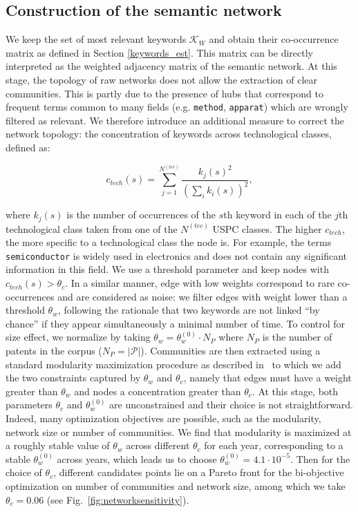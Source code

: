 \documentclass[12pt,twoside,a4paper]{article}
\begin{document}
\subsection{Construction of the semantic network}
\label{construction}

We keep the set of most relevant keywords $\mathcal{K}_W$ and obtain their co-occurrence matrix as defined in Section \ref{keywords_est}. This matrix can be directly interpreted as the weighted adjacency matrix of the semantic network. At this stage, the topology of raw networks does not allow the extraction of clear communities. This is partly due to the presence of hubs that correspond to frequent terms common to many fields (e.g. \texttt{method}, \texttt{apparat}) which are wrongly filtered as relevant. We therefore introduce an additional measure to correct the network topology: the concentration of keywords across technological classes, defined as: 

$$c_{tech}(s) = \displaystyle \sum_{j=1}^{N^{(tec)}} \frac{k_j(s)^2}{ \left(\sum_i k_i(s)\right)^2},$$  

where $k_j(s)$ is the number of occurrences of the $s$th keyword in each of the $j$th technological class taken from one of the $N^{(tec)}$ USPC classes. The higher $c_{tech}$, the more specific to a technological class the node is. For example, the terms \texttt{semiconductor} is widely used in electronics and does not contain any significant information in this field. We use a threshold parameter and keep nodes with $c_{tech}(s) > \theta_c$. In a similar manner, edge with low weights correspond to rare co-occurrences and are considered as noise: we filter edges with weight lower than a threshold $\theta_w$, following the rationale that two keywords are not linked ``by chance'' if they appear simultaneously a minimal number of time. To control for size effect, we normalize by taking $\theta_w = \theta_w^{(0)}\cdot N_P$ where $N_P$ is the number of patents in the corpus ($N_P = \left|\mathcal{P} \right|$). Communities are then extracted using a standard modularity maximization procedure as described in~\cite{clauset2004finding} to which we add the two constraints captured by $\theta_w$ and $\theta_c$, namely that edges must have a weight greater than $\theta_w$ and nodes a concentration greater than $\theta_c$. At this stage, both parameters $\theta_c$ and $\theta_w^{(0)}$ are unconstrained and their choice is not straightforward. Indeed, many optimization objectives are possible, such as the modularity, network size or number of communities. We find that modularity is maximized at a roughly stable value of $\theta_w$ across different $\theta_c$ for each year, corresponding to a stable $\theta_w^{(0)}$ across years, which leads us to choose $\theta_w^{(0)} = 4.1\cdot 10^{-5}$. Then for the choice of $\theta_c$, different candidates points lie on a Pareto front for the bi-objective optimization on number of communities and network size, among which we take $\theta_c = 0.06$ (see Fig.~\ref{fig:networksensitivity}).
\end{document}
